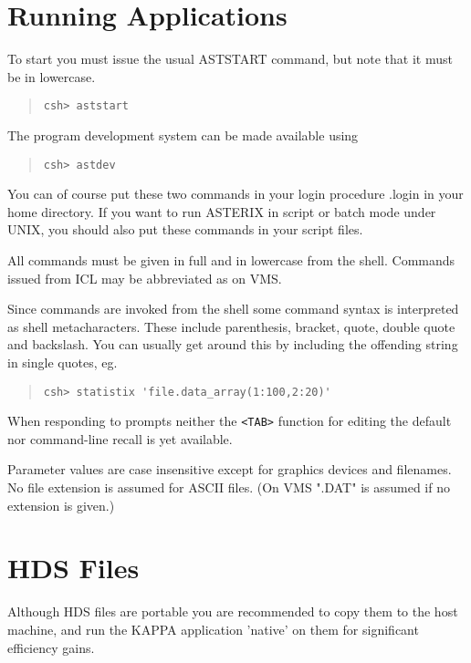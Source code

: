 \documentclass{book}
\renewcommand{\_}{{\tt\char'137}}     %
\begin{document}
\section{Running Applications}
To start you must issue the usual ASTSTART command, but note that
it must be in lowercase.
 
\begin{quote}\begin{verbatim}
csh> aststart
\end{verbatim}\end{quote}
The program development system can be made available using
\begin{quote}\begin{verbatim}
csh> astdev
\end{verbatim}\end{quote}
You can of course put these two commands in your login procedure
.login in your home directory. If you want to run ASTERIX in
script or batch mode under UNIX, you should also put these
commands in your script files.
 
All commands must be given in full and in lowercase from the shell.
Commands issued from ICL may be abbreviated as on VMS.
 
Since commands are invoked from the shell some command syntax is
interpreted as shell metacharacters. These include parenthesis,
bracket, quote, double quote and backslash. You can usually get
around this by including the offending string in single quotes, eg.
 
\begin{quote}\begin{verbatim}
csh> statistix 'file.data_array(1:100,2:20)'
\end{verbatim}\end{quote}
When responding to prompts neither the \verb+<TAB>+ function for editing
the default nor command-line recall is yet available.
 
Parameter values are case insensitive except for graphics devices
and filenames. No file extension is assumed for ASCII files. (On
VMS ".DAT" is assumed if no extension is given.)
 
\section{HDS Files}
Although HDS files are portable you are recommended to copy them to
the host machine, and run the KAPPA application 'native' on them for
significant efficiency gains.
 
\end{document}
